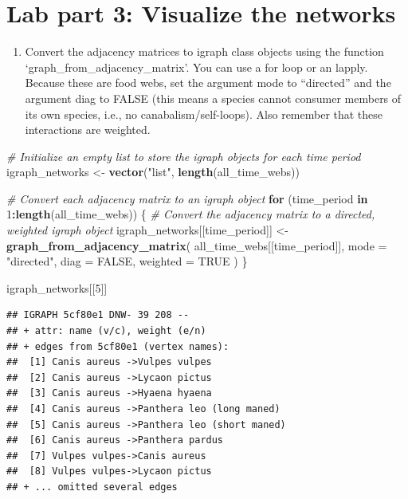 \documentclass[
]{article}
\newenvironment{Shaded}{\begin{snugshade}}{\end{snugshade}}
\newcommand{\AttributeTok}[1]{\textcolor[rgb]{0.13,0.29,0.53}{#1}}
\newcommand{\CommentTok}[1]{\textcolor[rgb]{0.56,0.35,0.01}{\textit{#1}}}
\newcommand{\ConstantTok}[1]{\textcolor[rgb]{0.56,0.35,0.01}{#1}}
\newcommand{\ControlFlowTok}[1]{\textcolor[rgb]{0.13,0.29,0.53}{\textbf{#1}}}
\newcommand{\DecValTok}[1]{\textcolor[rgb]{0.00,0.00,0.81}{#1}}
\newcommand{\FunctionTok}[1]{\textcolor[rgb]{0.13,0.29,0.53}{\textbf{#1}}}
\newcommand{\NormalTok}[1]{#1}
\newcommand{\OtherTok}[1]{\textcolor[rgb]{0.56,0.35,0.01}{#1}}
\newcommand{\SpecialCharTok}[1]{\textcolor[rgb]{0.81,0.36,0.00}{\textbf{#1}}}
\newcommand{\StringTok}[1]{\textcolor[rgb]{0.31,0.60,0.02}{#1}}
\providecommand{\tightlist}{%
  \setlength{\itemsep}{0pt}\setlength{\parskip}{0pt}}
\begin{document}
\section{Lab part 3: Visualize the
networks}\label{lab-part-3-visualize-the-networks}

\begin{enumerate}
\def\labelenumi{\alph{enumi}.}
\tightlist
\item
  Convert the adjacency matrices to igraph class objects using the
  function `graph\_from\_adjacency\_matrix'. You can use a for loop or
  an lapply. Because these are food webs, set the argument mode to
  ``directed'' and the argument diag to FALSE (this means a species
  cannot consumer members of its own species, i.e., no
  canabalism/self-loops). Also remember that these interactions are
  weighted.
\end{enumerate}

\begin{Shaded}
\begin{Highlighting}[]
\CommentTok{\# Initialize an empty list to store the igraph objects for each time period}
\NormalTok{igraph\_networks }\OtherTok{\textless{}{-}} \FunctionTok{vector}\NormalTok{(}\StringTok{"list"}\NormalTok{, }\FunctionTok{length}\NormalTok{(all\_time\_webs))}

\CommentTok{\# Convert each adjacency matrix to an igraph object}
\ControlFlowTok{for}\NormalTok{ (time\_period }\ControlFlowTok{in} \DecValTok{1}\SpecialCharTok{:}\FunctionTok{length}\NormalTok{(all\_time\_webs)) \{}
  \CommentTok{\# Convert the adjacency matrix to a directed, weighted igraph object}
\NormalTok{  igraph\_networks[[time\_period]] }\OtherTok{\textless{}{-}} \FunctionTok{graph\_from\_adjacency\_matrix}\NormalTok{(}
\NormalTok{    all\_time\_webs[[time\_period]], }
    \AttributeTok{mode =} \StringTok{"directed"}\NormalTok{, }
    \AttributeTok{diag =} \ConstantTok{FALSE}\NormalTok{, }
    \AttributeTok{weighted =} \ConstantTok{TRUE}
\NormalTok{  )}
\NormalTok{\}}

\NormalTok{igraph\_networks[[}\DecValTok{5}\NormalTok{]]}
\end{Highlighting}
\end{Shaded}

\begin{verbatim}
## IGRAPH 5cf80e1 DNW- 39 208 -- 
## + attr: name (v/c), weight (e/n)
## + edges from 5cf80e1 (vertex names):
##  [1] Canis aureus ->Vulpes vulpes             
##  [2] Canis aureus ->Lycaon pictus             
##  [3] Canis aureus ->Hyaena hyaena             
##  [4] Canis aureus ->Panthera leo (long maned) 
##  [5] Canis aureus ->Panthera leo (short maned)
##  [6] Canis aureus ->Panthera pardus           
##  [7] Vulpes vulpes->Canis aureus              
##  [8] Vulpes vulpes->Lycaon pictus             
## + ... omitted several edges
\end{verbatim}
\end{document}
